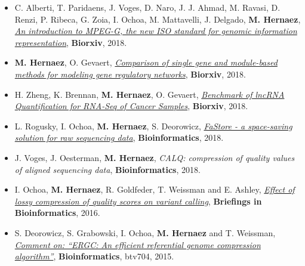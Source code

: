 \documentclass[11pt,a4paper,sans]{moderncv}        %
\begin{document}
\begin{itemize}

\item C. Alberti, T. Paridaens, J. Voges, D. Naro, J. J. Ahmad, M. Ravasi, D. Renzi, P. Ribeca, G. Zoia, I. Ochoa, M. Mattavelli, J. Delgado,  \textbf{M. Hernaez}, \href{https://www.biorxiv.org/content/early/2018/10/08/426353}{\textsl{An introduction to MPEG-G, the new ISO standard for genomic information representation}}, \textbf{Biorxiv}, 2018.\\

\item \textbf{M. Hernaez}, O. Gevaert, \href{https://www.biorxiv.org/content/early/2018/04/25/3078843}{\textsl{Comparison of single gene and module-based methods for modeling gene regulatory networks}}, \textbf{Biorxiv}, 2018.\\

\item H. Zheng, K. Brennan, \textbf{M. Hernaez}, O. Gevaert, \href{https://www.biorxiv.org/content/early/2018/01/09/241869}{\textsl{Benchmark of lncRNA Quantification for RNA-Seq of Cancer Samples}}, \textbf{Biorxiv}, 2018.\\

\item L. Rogusky, I. Ochoa, \textbf{M. Hernaez}, S. Deorowicz, \href{https://academic.oup.com/bioinformatics/article/34/16/2748/4956350}{\textsl{FaStore - a space-saving solution for raw sequencing data}}, \textbf{Bioinformatics}, 2018.\\

\item J. Voges, J. Oesterman, \textbf{M. Hernaez}, {\textsl{CALQ: compression of quality values of aligned sequencing data}}, \textbf{Bioinformatics}, 2018.\\

\item I. Ochoa, \textbf{M. Hernaez}, R. Goldfeder, T. Weissman and E. Ashley, \href{http://web.stanford.edu/~iochoa/publishedPublications/2015_effectLossyCompression.pdf}{\textsl{ Effect of lossy compression of quality scores on variant calling}}, \textbf{ Briefings in Bioinformatics}, 2016.\\

\item S. Deorowicz, S. Grabowski, I. Ochoa, \textbf{M. Hernaez} and T. Weissman, \href{http://web.stanford.edu/~iochoa/publishedPublications/2015_ergc-comment.pdf}{\emph{ Comment on: ``ERGC: An efficient referential genome compression algorithm''}}, \textbf{Bioinformatics}, btv704, 2015.\\


\end{itemize}
\end{document}
